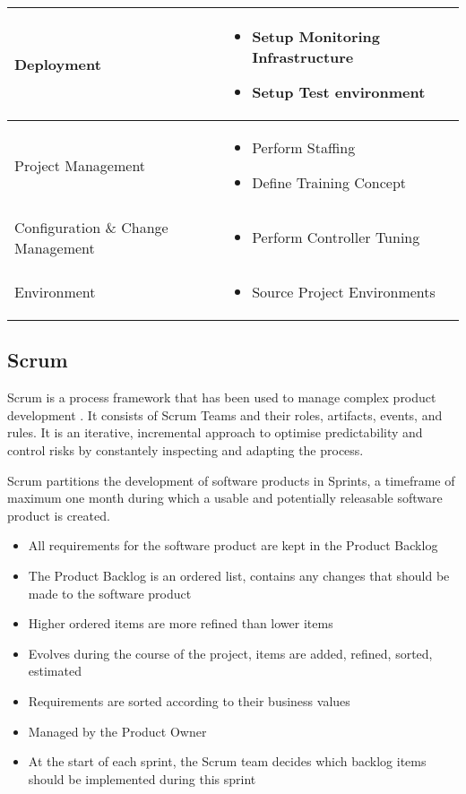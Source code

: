 \begin{tabularx}{\textwidth}{@{} l X @{}}
		\midrule
		Deployment & 
		\begin{itemize}
			\item Setup Monitoring Infrastructure
			\item Setup Test environment
		\end{itemize}
		\\
		\midrule
		Project Management & 
		\begin{itemize}
			\item Perform Staffing
			\item Define Training Concept
		\end{itemize}
		\\
		\midrule
		Configuration \& Change Management &
		\begin{itemize}
			\item Perform Controller Tuning
		\end{itemize}
		\\
		\midrule
		Environment & 
		\begin{itemize}
			\item Source Project Environments
		\end{itemize}
		\\
		\bottomrule
	\end{tabularx}
	
\subsection{Scrum}
Scrum is a process framework that has been used to manage complex product development \citep{Schwaber:2013aa}. It consists of Scrum Teams and their roles, artifacts, events, and rules. It is an iterative, incremental approach to optimise predictability and control risks by constantely inspecting and adapting the process.

Scrum partitions the development of software products in Sprints, a timeframe of maximum one month during which a usable and potentially releasable software product is created. 

\begin{itemize}
	\item All requirements for the software product are kept in the Product Backlog
	\item The Product Backlog is an ordered list, contains any changes that should be made to the software product
	\item Higher ordered items are more refined than lower items
	\item Evolves during the course of the project, items are added, refined, sorted, estimated
	\item Requirements are sorted according to their business values
	\item Managed by the Product Owner
	\item At the start of each sprint, the Scrum team decides which backlog items should be implemented during this sprint
\end{itemize}

